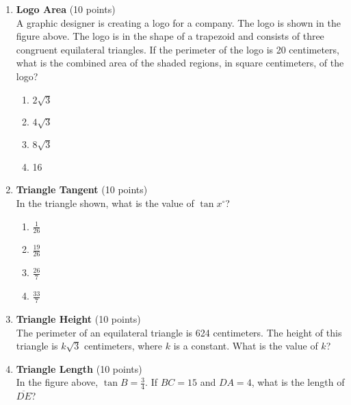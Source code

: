 \begin{enumerate}
  \item \textbf{Logo Area} (10 points)\\
  A graphic designer is creating a logo for a company. The logo is shown in the figure above. The logo is in the shape of a trapezoid and consists of three congruent equilateral triangles. If the perimeter of the logo is 20 centimeters, what is the combined area of the shaded regions, in square centimeters, of the logo?\\
  \begin{enumerate}[label=(\Alph*)]
    \item $2 \sqrt{3}$
    \item $4 \sqrt{3}$
    \item $8 \sqrt{3}$
    \item 16
  \end{enumerate}
  \begin{subanswer}
  \end{subanswer}


  \newpage

  \item \textbf{Triangle Tangent} (10 points)\\
  In the triangle shown, what is the value of $\tan x^{\circ}$?\\
  \begin{enumerate}[label=(\Alph*)]
    \item $\frac{1}{26}$
    \item $\frac{19}{26}$
    \item $\frac{26}{7}$
    \item $\frac{33}{7}$
  \end{enumerate}
  \begin{subanswer}
  \end{subanswer}

  \item \textbf{Triangle Height} (10 points)\\
  The perimeter of an equilateral triangle is 624 centimeters. The height of this triangle is $k \sqrt{3}$ centimeters, where $k$ is a constant. What is the value of $k$?
  \begin{subanswer}
  \end{subanswer}

  \newpage

  \item \textbf{Triangle Length} (10 points)\\
  In the figure above, $\tan B=\frac{3}{4}$. If $B C=15$ and $D A=4$, what is the length of $\overline{D E}$?
  \begin{subanswer}
  \end{subanswer}
\end{enumerate}




